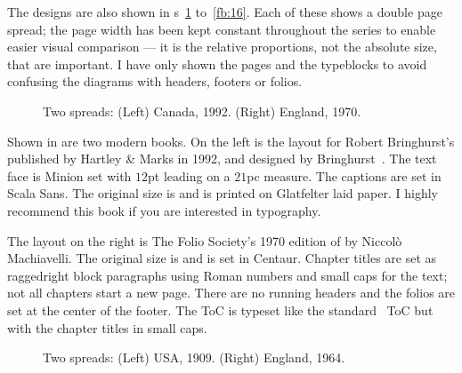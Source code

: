 \documentclass[10pt,letterpaper,extrafontsizes]{memoir}
\begin{document}
    The designs are also shown in \figurerefname s~\ref{fb:1} 
to~\ref{fb:16}. Each of these shows a double page spread; the 
page width has been kept constant throughout the series to enable easier
visual comparison --- it is the relative proportions, not the absolute size, 
that are important. I have only shown the pages and the typeblocks to avoid
confusing the diagrams with headers, footers 
or folios.


\begin{figure}
\centering
\begin{minipage}[b]{\pwlayi}
\end{minipage}
\hfill
\begin{minipage}[b]{\pwlayi}
\end{minipage}
\caption[Two spreads: Canada, 1992 and England, 1970]%
        {Two spreads: (Left) Canada, 1992. %
         (Right) England, 1970.} \label{fb:1}
\end{figure}

    Shown in  are two modern books. On the left is the layout
for Robert Bringhurst's 
 published
by Hartley \& Marks in 1992, and designed by Bringhurst~\autocite{BRINGHURST99}. 
The text face is
Minion set with $12$pt leading on a $21$pc measure. 
The captions are set in Scala Sans. The original
size is  and is printed on Glatfelter laid 
paper. 
I highly recommend this book if you are
interested in typography. 

The layout on the right is The Folio Society's
1970 edition of  by Niccol\`{o} Machiavelli. The original
size is  and is set in  
Centaur.
Chapter titles are set as raggedright block 
paragraphs using Roman numbers
and small caps for the text; not all chapters start a new page. There are
no running headers and the folios 
are set at the center of the footer.
The ToC is typeset like the standard \ltx\ ToC 
but with the chapter titles
in small caps.



\begin{figure}
\centering
\begin{minipage}[b]{\pwlayi}
\end{minipage}
\hfill
\begin{minipage}[b]{\pwlayi}
\end{minipage}
\caption[Two spreads: USA, 1909 and England, 1964.]%
        {Two spreads: (Left) USA, 1909.
         (Right) England, 1964.} \label{fb:2}
\end{figure}
\end{document}
